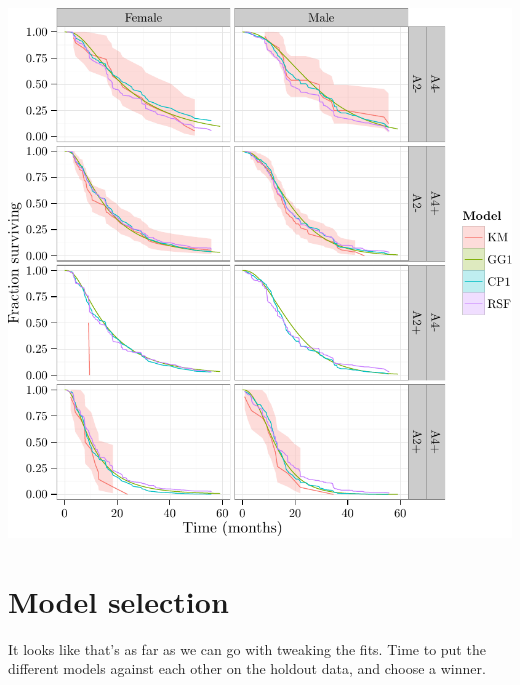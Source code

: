 \documentclass{article}\usepackage[]{graphicx}\usepackage[]{color}
\makeatletter
\def\maxwidth{ %
  \ifdim\Gin@nat@width>\linewidth
    \linewidth
  \else
    \Gin@nat@width
  \fi
}
\newenvironment{knitrout}{}{} %
\makeatother
\begin{document}
\begin{knitrout}
{\centering \includegraphics[width=\maxwidth]{figure/05-final-fit-assessment-2} 

}



\end{knitrout}


\section{Model selection}
It looks like that's as far as we can go with tweaking the fits.  Time to put the different models against each other on the holdout data, and choose a winner.
\end{document}
